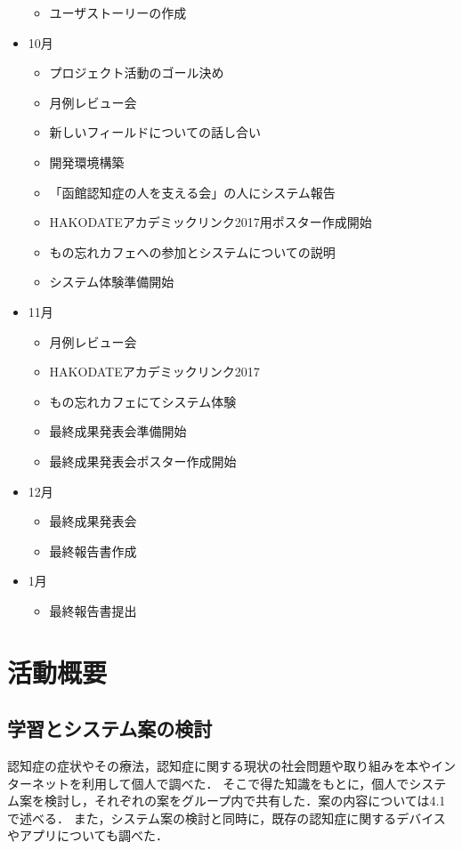 \documentclass[../report]{subfiles}
\begin{document}
\begin{itemize}
\begin{itemize}
        \item ユーザストーリーの作成
    \end{itemize}
    \item[] 10月
    \begin{itemize}
        \item プロジェクト活動のゴール決め
        \item 月例レビュー会
        \item 新しいフィールドについての話し合い
        \item 開発環境構築
        \item 「函館認知症の人を支える会」の人にシステム報告
        \item HAKODATEアカデミックリンク2017用ポスター作成開始
        \item もの忘れカフェへの参加とシステムについての説明
        \item システム体験準備開始
    \end{itemize}
    \item[] 11月
    \begin{itemize}
        \item 月例レビュー会
        \item HAKODATEアカデミックリンク2017
        \item もの忘れカフェにてシステム体験
        \item 最終成果発表会準備開始
        \item 最終成果発表会ポスター作成開始
    \end{itemize}
    \item[] 12月
    \begin{itemize}
        \item 最終成果発表会
        \item 最終報告書作成
    \end{itemize}
    \item[] 1月
    \begin{itemize}
        \item 最終報告書提出
    \end{itemize}
\end{itemize}


\section{活動概要}
\subsection{学習とシステム案の検討} \label{sec:discuss}
認知症の症状やその療法，認知症に関する現状の社会問題や取り組みを本やインターネットを利用して個人で調べた．
そこで得た知識をもとに，個人でシステム案を検討し，それぞれの案をグループ内で共有した．案の内容については4.1 で述べる．
また，システム案の検討と同時に，既存の認知症に関するデバイスやアプリについても調べた．
\end{document}
